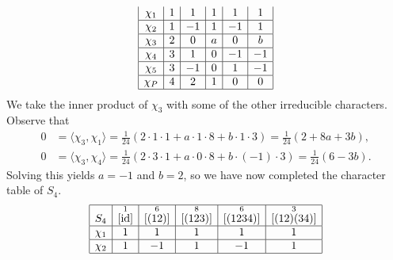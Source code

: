 \begin{exmp}{}
\begin{align*}
\begin{array}{|c|c|c|c|c|c|}
            \chi_1 & 1                  & 1                   & 1                    & 1                     & 1                       \\ \hline
            \chi_2 & 1                  & -1                  & 1                    & -1                    & 1                       \\ \hline
            \chi_3 & 2                  & 0                   & a                    & 0                     & b                       \\ \hline
            \chi_4 & 3                  & 1                   & 0                    & -1                    & -1                      \\ \hline
            \chi_5 & 3                  & -1                  & 0                    & 1                     & -1                      \\ \hline
            \chi_P & 4                  & 2                   & 1                    & 0                     & 0                       \\ \hline 
        \end{array} 
    \end{align*}
    We take the inner product of $\chi_3$ with some of the other irreducible 
    characters. Observe that 
    \begin{align*}
        0 &= \langle \chi_3, \chi_1 \rangle = \frac1{24}(2 \cdot 1 \cdot 1 
        + a \cdot 1 \cdot 8 + b \cdot 1 \cdot 3) = \frac1{24}(2 + 8a + 3b), \\ 
        0 &= \langle \chi_3, \chi_4 \rangle = \frac1{24}(2 \cdot 3 \cdot 1 
        + a \cdot 0 \cdot 8 + b \cdot (-1) \cdot 3) = \frac1{24}(6 - 3b). 
    \end{align*}
    Solving this yields $a = -1$ and $b = 2$, so we have now completed 
    the character table of $S_4$. 
    \begin{align*}
        \begin{array}{|c|c|c|c|c|c|}
            \hline
            S_4    & \overset{1}{[\operatorname{id}]} & \overset{6}{[(12)]} & \overset{8}{[(123)]} & \overset{6}{[(1234)]} & \overset{3}{[(12)(34)]} \\ \hline
            \chi_1 & 1                  & 1                   & 1                    & 1                     & 1                       \\ \hline
            \chi_2 & 1                  & -1                  & 1                    & -1                    & 1                       \\ \hline

\end{array}
\end{align*}
\end{exmp}
